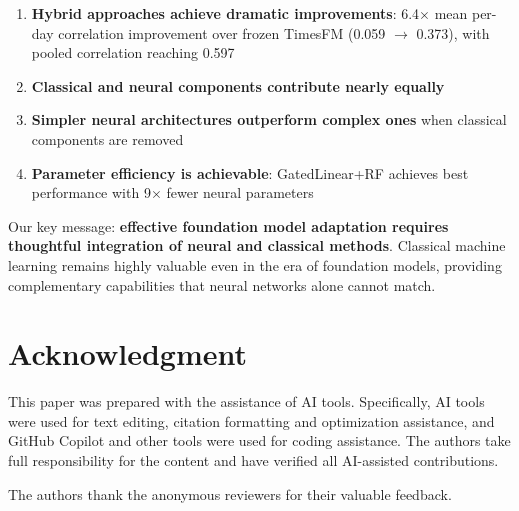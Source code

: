 \documentclass[10pt,conference]{IEEEtran}
\newcommand{\rev}[1]{#1}
\begin{document}
\begin{enumerate}
    \item \textbf{Hybrid approaches achieve dramatic improvements}: \rev{6.4$\times$ mean per-day correlation improvement over frozen TimesFM (0.059 $\to$ 0.373), with pooled correlation reaching 0.597}
    \item \textbf{Classical and neural components contribute nearly equally}
    \item \textbf{Simpler neural architectures outperform complex ones} when classical components are removed
    \item \textbf{Parameter efficiency is achievable}: GatedLinear+RF achieves best performance with 9$\times$ fewer neural parameters
    
\end{enumerate}

Our key message: \textbf{effective foundation model adaptation requires thoughtful integration of neural and classical methods}. Classical machine learning remains highly valuable even in the era of foundation models, providing complementary capabilities that neural networks alone cannot match.

\section*{Acknowledgment}

This paper was prepared with the assistance of AI tools. \rev{Specifically, AI tools were used for text editing, citation formatting and optimization assistance, and GitHub Copilot and other tools were used for coding assistance.} The authors take full responsibility for the content and have verified all AI-assisted contributions.

\rev{The authors thank the anonymous reviewers for their valuable feedback.}
\end{document}

